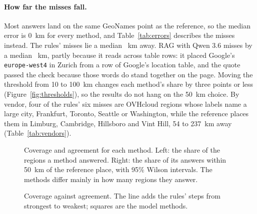 \documentclass[10pt,twocolumn]{article}
\newcommand{\code}[1]{\texttt{#1}}
\begin{document}
\paragraph{How far the misses fall.} Most answers land on the same GeoNames point as the reference, so the median error is 0~km for every method, and Table~\ref{tab:errors} describes the misses instead. The rules' \statRulesMisses{} misses lie a median \statRulesMissMedianKm{}~km away. RAG with Qwen 3.6 misses by a median \statRagQwenthreeSixMissMedianKm{}~km, partly because it reads across table rows: it placed Google's \code{europe-west4} in Zurich from a row of Google's location table, and the quote passed the check because those words do stand together on the page. Moving the threshold from 10 to 100~km changes each method's share by three points or less (Figure~\ref{fig:thresholds}), so the results do not hang on the 50~km choice. By vendor, four of the rules' six misses are OVHcloud regions whose labels name a large city, Frankfurt, Toronto, Seattle or Washington, while the reference places them in Limburg, Cambridge, Hillsboro and Vint Hill, 54 to 237~km away (Table~\ref{tab:vendors}).

\begin{table}[htbp]
\centering
\small

\caption{The placer under other settings. An asterisk marks the value in use. The 95\% range is a Wilson interval on agreement with our placements.}
\label{tab:sensitivity}
\end{table}

\begin{figure}[htbp]
\centering

\caption{Coverage and agreement for each method. Left: the share of the \llmRulesRegions{} regions a method answered. Right: the share of its answers within 50~km of the reference place, with 95\% Wilson intervals. The methods differ mainly in how many regions they answer.}
\label{fig:coverage}
\end{figure}

\begin{table}[htbp]
\centering
\small

\caption{Exact McNemar tests for each pair of methods. ``Only A'' counts regions method A matched and method B did not. All regions counts an unplaced region as a miss; both answered keeps only regions both methods answered. Each family is adjusted with Holm's method.}
\label{tab:pairs}
\end{table}

\begin{figure}[htbp]
\centering

\caption{Coverage against agreement. The line adds the rules' steps from strongest to weakest; squares are the model methods.}
\label{fig:tiers}
\end{figure}
\end{document}
